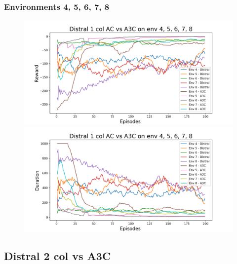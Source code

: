 \documentclass[12pt]{report}
\begin{document}
\subsubsection{Environments 4, 5, 6, 7, 8}
\begin{figure}[H]
\centering
\begin{minipage}{.5\textwidth}
\centering
\includegraphics[width=\textwidth]{figs/d1_col_ac/d1_col_ac_4_5_6_7_8_rwd.png}
\end{minipage}%
\centering
\begin{minipage}{.5\textwidth}
\centering
\includegraphics[width=\textwidth]{figs/d1_col_ac/d1_col_ac_4_5_6_7_8_dur.png}
\end{minipage}%
\end{figure}

\subsection{Distral 2 col vs A3C}
\end{document}
